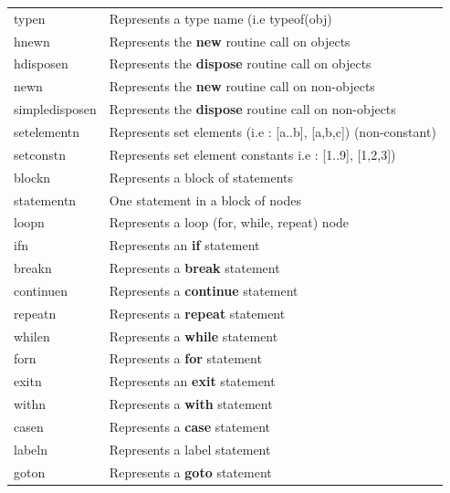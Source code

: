 \documentclass [12pt]{article}
\begin{document}
\begin{longtable}{|l|p{10cm}|}
\textsf{typen}& 
		\textsf{Represents a type name (i.e typeof(obj)} \\
\textsf{hnewn}& 
		\textsf{Represents the }\textsf{\textbf{new }}\textsf{routine call on objects} \\
\textsf{hdisposen}& 
		\textsf{Represents the }\textsf{\textbf{dispose}}\textsf{ routine call on objects} \\
\textsf{newn}& 
		\textsf{Represents the }\textsf{\textbf{new}}\textsf{ routine call on non-objects} \\
\textsf{simpledisposen}& 
		\textsf{Represents the }\textsf{\textbf{dispose}}\textsf{ routine call on non-objects} \\
\textsf{setelementn}& 
		\textsf{Represents set elements (i.e : [a..b], [a,b,c]) (non-constant)} \\
\textsf{setconstn}& 
		\textsf{Represents set element constants i.e : [1..9], [1,2,3])} \\
\textsf{blockn}& 
		\textsf{Represents a block of statements} \\
\textsf{statementn}& 
		\textsf{One statement in a block of nodes} \\
\textsf{loopn}& 
		\textsf{Represents a loop (for, while, repeat) node} \\
\textsf{ifn}& 
		\textsf{Represents an }\textsf{\textbf{if}}\textsf{ statement} \\
\textsf{breakn}& 
		\textsf{Represents a }\textsf{\textbf{break}}\textsf{ statement} \\
\textsf{continuen}& 
		\textsf{Represents a }\textsf{\textbf{continue}}\textsf{ statement} \\
\textsf{repeatn}& 
		\textsf{Represents a }\textsf{\textbf{repeat }}\textsf{statement} \\
\textsf{whilen}& 
		\textsf{Represents a }\textsf{\textbf{while}}\textsf{ statement} \\
\textsf{forn}& 
		\textsf{Represents a }\textsf{\textbf{for}}\textsf{ statement} \\
\textsf{exitn}& 
		\textsf{Represents an }\textsf{\textbf{exit}}\textsf{ statement} \\
\textsf{withn}& 
		\textsf{Represents a }\textsf{\textbf{with}}\textsf{ statement} \\
\textsf{casen}& 
		\textsf{Represents a }\textsf{\textbf{case}}\textsf{ statement} \\
\textsf{labeln}& 
		\textsf{Represents a label statement} \\
\textsf{goton}& 
		\textsf{Represents a }\textsf{\textbf{goto}}\textsf{ statement} \\

\end{longtable}
\end{document}
